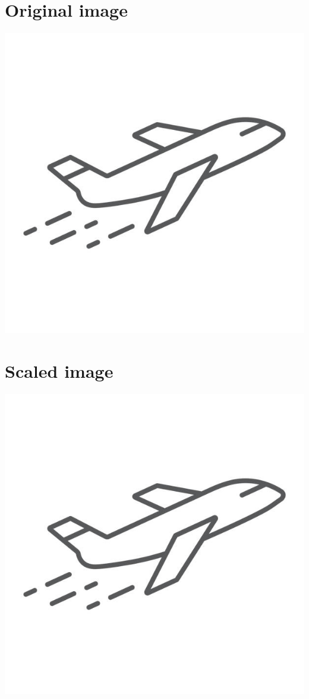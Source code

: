 \documentclass{article}
\begin{document}
	\section{Original image}
	\includegraphics{plane.jpg} %
	
	\section{Scaled image}
	\includegraphics[scale=0.5]{plane.jpg} %
	
\end{document}

